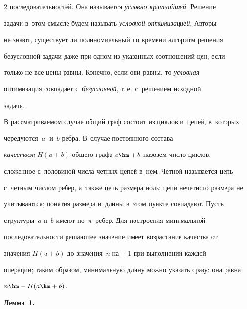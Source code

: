 \begin{multicols}{2}
последовательностей. Она называется \textit{условно кратчайшей}. Решение 


задачи в~этом смысле будем называть \textit{условной оптимизацией}. Авторы 


не знают, существует ли полиномиальный по времени алгоритм решения 


безусловной задачи даже при одном из указанных соотношений цен, если 


только не все цены равны. Конечно, если они равны, то \textit{условная} 


оптимизация совпадает с~\textit{безусловной}, т.\,е.\ с~решением исходной 


задачи. 


  


  В рассматриваемом случае общий граф состоит из циклов и~цепей, в~которых 


чередуются~$a$- и~$b$-реб\-ра. В~случае постоянного состава 


\textit{качеством} $H(a+b)$ общего графа $a\hm+b$ назовем число циклов, 


сложенное с~половиной числа четных цепей в~нем. Четной называется цепь 


с~четным числом ребер, а~так\-же цепь размера ноль; цепи нечетного размера не 


учитываются; понятия размера и~длины в~этом пункте совпадают. Пусть 


структуры~$a$ и~$b$ имеют по~$n$~ребер. Для построения минимальной 


последовательности решающее значение имеет возрастание качества от 


значения $H(a+b)$ до значения~$n$ на~$+1$ при выполнении каждой 


операции; таким образом, минимальную длину можно указать сразу: она равна 


$n\hm- H(a\hm+b)$. 


  


  \smallskip


    


  \noindent


  \textbf{Лемма~1.}


\end{multicols}
